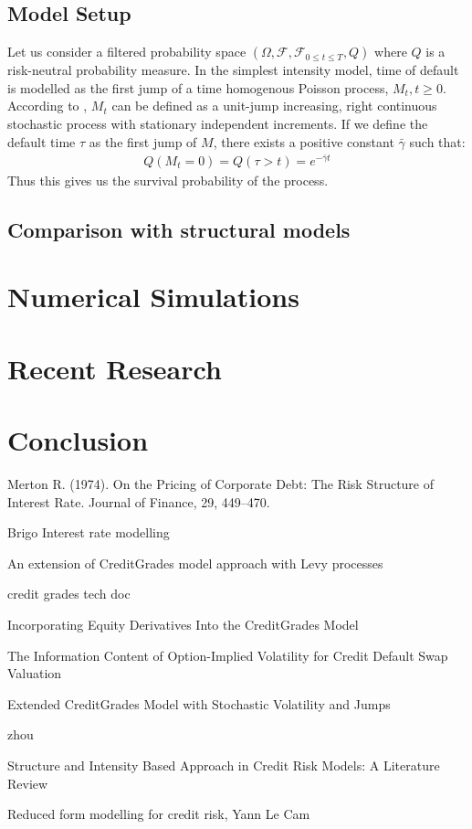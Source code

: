 \documentclass[11t,a4paper]{article}
\begin{document}
\subsection{Model Setup}
Let us consider a filtered probability space $(\Omega, \mathcal{F}, \mathcal{F}_{0\leq{t}\leq{T}}, Q)$ where $Q$ is a risk-neutral probability measure. In the simplest intensity model, time of default is modelled as the first jump of a time homogenous Poisson process, ${M_t, t\geq 0}$. According to \cite{Brigobook}, $M_t$ can be defined as a unit-jump increasing, right continuous stochastic process with stationary independent increments. If we define the default time $\tau$ as the first jump of $M$, there exists a positive constant $\bar{\gamma}$ such that:
\begin{align}Q(M_t=0)=Q(\tau> t)=e^{-\bar{\gamma}t}\end{align}
Thus this gives us the survival probability of the process. 

\subsection{Comparison with structural models}
\section{Numerical Simulations}
\section{Recent Research}
\section{Conclusion}
\newpage
\begin{thebibliography}{1}
Merton R. (1974).  On the Pricing of Corporate Debt: The Risk Structure of Interest Rate. Journal of Finance, 29, 449–470.

Brigo Interest rate modelling

An extension of CreditGrades model approach with Levy processes

credit grades tech doc

Incorporating Equity Derivatives Into the CreditGrades Model

The Information Content of Option-Implied Volatility for Credit Default Swap Valuation

Extended CreditGrades Model with Stochastic Volatility and Jumps

zhou 

Structure and Intensity Based Approach in Credit Risk Models: A Literature Review

Reduced form modelling for credit risk, Yann Le Cam

\end{thebibliography}
\end{document}
